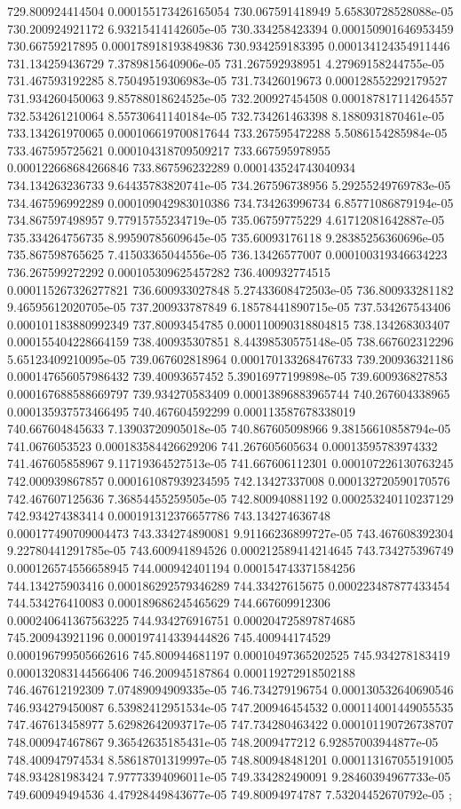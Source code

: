 {729.800924414504 0.000155173426165054
730.067591418949 5.65830728528088e-05
730.200924921172 6.93215414142605e-05
730.334258423394 0.000150901646953459
730.66759217895 0.000178918193849836
730.934259183395 0.000134124354911446
731.134259436729 7.3789815640906e-05
731.267592938951 4.27969158244755e-05
731.467593192285 8.75049519306983e-05
731.73426019673 0.000128552292179527
731.934260450063 9.85788018624525e-05
732.200927454508 0.000187817114264557
732.534261210064 8.55730641140184e-05
732.734261463398 8.1880931870461e-05
733.134261970065 0.000106619700817644
733.267595472288 5.5086154285984e-05
733.467595725621 0.000104318709509217
733.667595978955 0.000122668684266846
733.867596232289 0.000143524743040934
734.134263236733 9.64435783820741e-05
734.267596738956 5.29255249769783e-05
734.467596992289 0.000109042983010386
734.734263996734 6.85771086879194e-05
734.867597498957 9.77915755234719e-05
735.06759775229 4.61712081642887e-05
735.334264756735 8.99590785609645e-05
735.60093176118 9.28385256360696e-05
735.867598765625 7.41503365044556e-05
736.13426577007 0.000100319346634223
736.267599272292 0.000105309625457282
736.400932774515 0.000115267326277821
736.600933027848 5.27433608472503e-05
736.800933281182 9.46595612020705e-05
737.200933787849 6.18578441890715e-05
737.534267543406 0.000101183880992349
737.80093454785 0.000110090318804815
738.134268303407 0.000155404228664159
738.400935307851 8.44398530575148e-05
738.667602312296 5.65123409210095e-05
739.067602818964 0.000170133268476733
739.200936321186 0.000147656057986432
739.40093657452 5.39016977199898e-05
739.600936827853 0.000167688588669797
739.934270583409 0.00013896883965744
740.267604338965 0.000135937573466495
740.467604592299 0.000113587678338019
740.667604845633 7.13903720905018e-05
740.867605098966 9.38156610858794e-05
741.0676053523 0.000183584426629206
741.267605605634 0.00013595783974332
741.467605858967 9.11719364527513e-05
741.667606112301 0.000107226130763245
742.000939867857 0.000161087939234595
742.13427337008 0.000132720590170576
742.467607125636 7.36854455259505e-05
742.800940881192 0.000253240110237129
742.934274383414 0.000191312376657786
743.134274636748 0.000177490709004473
743.334274890081 9.91166236899727e-05
743.467608392304 9.22780441291785e-05
743.600941894526 0.000212589414214645
743.734275396749 0.000126574556658945
744.000942401194 0.000154743371584256
744.134275903416 0.000186292579346289
744.33427615675 0.000223487877433454
744.534276410083 0.000189686245465629
744.667609912306 0.000240641367563225
744.934276916751 0.000204725897874685
745.200943921196 0.000197414339444826
745.400944174529 0.000196799505662616
745.800944681197 0.00010497365202525
745.934278183419 0.000132083144566406
746.200945187864 0.000119272918502188
746.467612192309 7.07489094909335e-05
746.734279196754 0.000130532640690546
746.934279450087 6.53982412951534e-05
747.200946454532 0.000114001449055535
747.467613458977 5.62982642093717e-05
747.734280463422 0.000101190726738707
748.000947467867 9.36542635185431e-05
748.2009477212 6.92857003944877e-05
748.400947974534 8.58618701319997e-05
748.800948481201 0.000113167055191005
748.934281983424 7.97773394096011e-05
749.334282490091 9.28460394967733e-05
749.600949494536 4.47928449843677e-05
749.80094974787 7.53204452670792e-05
};